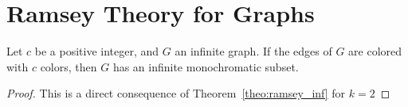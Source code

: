 \chapter{Ramsey Theory for Graphs}







\begin{theorem}
  \label{theo:ramsey_infgraph}  \leanok {}

  Let $c$ be a positive integer, and $G$ an infinite graph. If the edges of $G$
  are colored with $c$ colors, then $G$ has an infinite monochromatic subset.
\end{theorem}

\begin{proof}
  \leanok {}

  This is a direct consequence of Theorem~\ref{theo:ramsey_inf} for $k=2$
\end{proof}